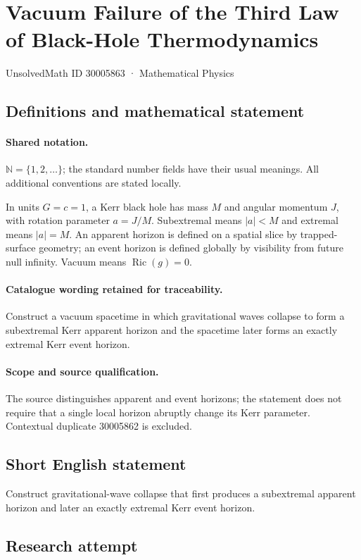 \documentclass[11pt]{article}
\begin{document}
\setcounter{section}{30005862}
\section{Vacuum Failure of the Third Law of Black-Hole Thermodynamics}\label{30005863}
{\small UnsolvedMath ID 30005863 · Mathematical Physics}
\subsection{Definitions and mathematical statement}

\paragraph{Shared notation.}$\mathbb N=\{1,2,\ldots\}$; the standard number fields have their usual meanings. All additional conventions are stated locally.


In units $G=c=1$, a Kerr black hole has mass $M$ and angular momentum $J$, with rotation parameter $a=J/M$. Subextremal means $|a|<M$ and extremal means $|a|=M$. An apparent horizon is defined on a spatial slice by trapped-surface geometry; an event horizon is defined globally by visibility from future null infinity. Vacuum means $\operatorname{Ric}(g)=0$.

\paragraph{Catalogue wording retained for traceability.}
Construct a vacuum spacetime in which gravitational waves collapse to form a subextremal Kerr apparent horizon and the spacetime later forms an exactly extremal Kerr event horizon.

\paragraph{Scope and source qualification.}The source distinguishes apparent and event horizons; the statement does not require that a single local horizon abruptly change its Kerr parameter. Contextual duplicate 30005862 is excluded.
\subsection{Short English statement}
Construct gravitational-wave collapse that first produces a subextremal apparent horizon and later an exactly extremal Kerr event horizon.
\subsection{Research attempt}
\end{document}
